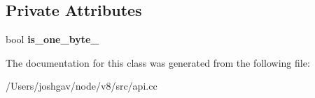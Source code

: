 \subsection*{Private Attributes}
\begin{DoxyCompactItemize}
\item 
bool {\bfseries is\+\_\+one\+\_\+byte\+\_\+}\hypertarget{classv8_1_1_contains_only_one_byte_helper_a091d8c50848f4d020ef85944eec8564b}{}\label{classv8_1_1_contains_only_one_byte_helper_a091d8c50848f4d020ef85944eec8564b}

\end{DoxyCompactItemize}


The documentation for this class was generated from the following file\+:\begin{DoxyCompactItemize}
\item 
/\+Users/joshgav/node/v8/src/api.\+cc\end{DoxyCompactItemize}
